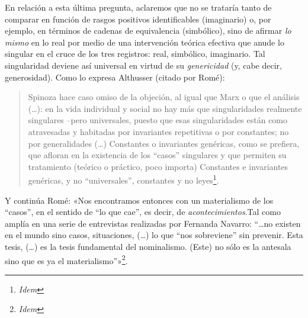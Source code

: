 En relación a esta última pregunta, aclaremos que no se trataría tanto de comparar en función de rasgos positivos identificables (imaginario) o, por ejemplo, en términos de cadenas de equivalencia (simbólico), sino de afirmar \emph{lo mismo} en lo real por medio de una intervención teórica efectiva que anude lo singular en el cruce de los tres registros: real, simbólico, imaginario. Tal singularidad deviene así universal en virtud de su \emph{genericidad} (y, cabe decir, generosidad). Como lo expresa Althusser (citado por Romé):

\begin{quote}
Spinoza hace caso omiso de la objeción, al igual que Marx o que el análisis (\ldots): en la vida individual y social no hay más que singularidades realmente singulares --pero universales, puesto que esas singularidades están como atravesadas y habitadas por invariantes repetitivas o por constantes; no por generalidades (\ldots) Constantes o invariantes genéricas, como se prefiera, que afloran en la existencia de los ``casos'' singulares y que permiten su tratamiento (teórico o práctico, poco importa) Constantes e invariantes genéricas, y no ``universales'', constantes y no leyes\footnote{\emph{Idem}}.
\end{quote}

Y continúa Romé: «Nos encontramos entonces con un materialismo de los ``casos'', en el sentido de ``lo que cae'', es decir, de \emph{acontecimientos}.Tal como amplía en una serie de entrevistas realizadas por Fernanda Navarro: ``\ldots no existen en el mundo sino casos, situaciones, (\ldots) lo que ``nos sobreviene'' sin prevenir. Esta tesis, (\ldots) es la tesis fundamental del nominalismo. (Este) no sólo es la antesala sino que es ya el materialismo''»\footnote{\emph{Idem}}.

